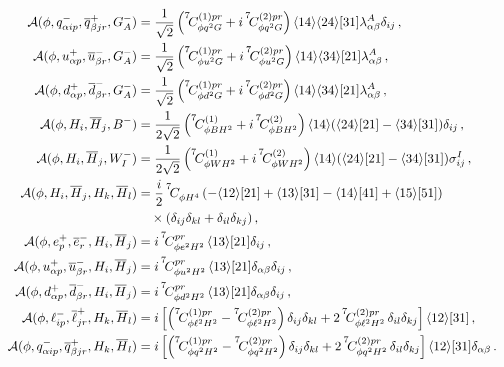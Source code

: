 \begin{align}
    \\
    \mathcal A(\phi,q_{\alpha ip}^-,\overline q_{\beta jr}^+,G_A^-) &= \frac{1}{\sqrt{2}}\left(\coef{7}{\phi q^2 G}{(1)pr} + i\,\coef{7}{\phi q^2 G}{(2)pr}\right) \agl{1}{4}\agl{2}{4}\sqr{3}{1}\lambda^A_{\alpha\beta}\delta_{ij} \,,
    \\
    \mathcal A(\phi,u_{\alpha p}^+,\overline u_{\beta r}^-,G_A^-) &= \frac{1}{\sqrt{2}}\left(\coef{7}{\phi u^2 G}{(1)pr} + i\,\coef{7}{\phi u^2 G}{(2)pr}\right) \agl{1}{4}\agl{3}{4}\sqr{2}{1}\lambda^A_{\alpha\beta} \,,
    \\
    \mathcal A(\phi,d_{\alpha p}^+,\overline d_{\beta r}^-,G_A^-) &= \frac{1}{\sqrt{2}}\left(\coef{7}{\phi d^2 G}{(1)pr} + i\,\coef{7}{\phi d^2 G}{(2)pr}\right) \agl{1}{4}\agl{3}{4}\sqr{2}{1}\lambda^A_{\alpha\beta} \,,
    \\
    \mathcal A(\phi,H_i,\overline H_j,B^-) &= \frac{1}{2\sqrt{2}}\left(\coef{7}{\phi B H^2}{(1)} + i \,\coef{7}{\phi B H^2}{(2)}\right)\agl{1}{4}(\agl{2}{4}\sqr{2}{1}-\agl{3}{4}\sqr{3}{1})\delta_{ij}\,,
    \\
    \mathcal A(\phi,H_i,\overline H_j,W_I^-) &= \frac{1}{2\sqrt{2}}\left(\coef{7}{\phi W H^2}{(1)} + i \,\coef{7}{\phi W H^2}{(2)}\right)\agl{1}{4}(\agl{2}{4}\sqr{2}{1}-\agl{3}{4}\sqr{3}{1})\sigma^I_{ij}\,,
    \\
    \mathcal A(\phi,H_i,\overline H_j,H_k,\overline H_l) &= \frac{i}{2}\,\coef{7}{\phi H^4}{}\left(-\agl{1}{2}\sqr{2}{1}+\agl{1}{3}\sqr{3}{1}-\agl{1}{4}\sqr{4}{1}+\agl{1}{5}\sqr{5}{1}\right)\nonumber \\
    &\quad \times (\delta_{ij}\delta_{kl}+\delta_{il}\delta_{kj})\,,
    \\
    \mathcal A(\phi, e^+_p,\overline e^-_r, H_i,\overline H_j) &= i\,\coef{7}{\phi e^2 H^2}{pr}\,\agl{1}{3}\sqr{2}{1}\delta_{ij}\,,
    \\
    \mathcal A(\phi, u^+_{\alpha p},\overline u^-_{\beta r}, H_i,\overline H_j) &= i\,\coef{7}{\phi u^2 H^2}{pr}\,\agl{1}{3}\sqr{2}{1}\delta_{\alpha\beta}\delta_{ij}\,,
    \\
    \mathcal A(\phi, d^+_{\alpha p},\overline d^-_{\beta r}, H_i,\overline H_j) &= i\,\coef{7}{\phi d^2 H^2}{pr}\,\agl{1}{3}\sqr{2}{1}\delta_{\alpha\beta}\delta_{ij}\,,
    \\
    \mathcal A (\phi,\ell^-_{ip},\overline \ell^+_{jr},H_k,\overline H_l) &= i\left[\left(\coef{7}{\phi \ell^2 H^2}{(1)pr}-\coef{7}{\phi \ell^2 H^2}{(2)pr}\right)\delta_{ij}\delta_{kl}+2\,\coef{7}{\phi \ell^2 H^2}{(2)pr}\,\delta_{il}\delta_{kj}\right]\agl{1}{2}\sqr{3}{1}\,,
    \\
    \mathcal A (\phi,q^-_{\alpha ip},\overline q^+_{\beta jr},H_k,\overline H_l) &= i\left[\left(\coef{7}{\phi q^2 H^2}{(1)pr}-\coef{7}{\phi q^2 H^2}{(2)pr}\right)\delta_{ij}\delta_{kl}+2\,\coef{7}{\phi q^2 H^2}{(2)pr}\,\delta_{il}\delta_{kj}\right]\agl{1}{2}\sqr{3}{1}\delta_{\alpha\beta}\,.
\end{align}


